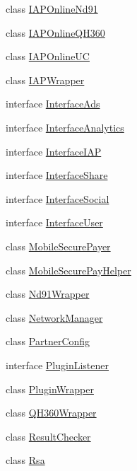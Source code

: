 \begin{DoxyCompactItemize}
class \hyperlink{classorg_1_1cocos2dx_1_1plugin_1_1IAPOnlineNd91}{I\+A\+P\+Online\+Nd91}
\item 
class \hyperlink{classorg_1_1cocos2dx_1_1plugin_1_1IAPOnlineQH360}{I\+A\+P\+Online\+Q\+H360}
\item 
class \hyperlink{classorg_1_1cocos2dx_1_1plugin_1_1IAPOnlineUC}{I\+A\+P\+Online\+UC}
\item 
class \hyperlink{classorg_1_1cocos2dx_1_1plugin_1_1IAPWrapper}{I\+A\+P\+Wrapper}
\item 
interface \hyperlink{interfaceorg_1_1cocos2dx_1_1plugin_1_1InterfaceAds}{Interface\+Ads}
\item 
interface \hyperlink{interfaceorg_1_1cocos2dx_1_1plugin_1_1InterfaceAnalytics}{Interface\+Analytics}
\item 
interface \hyperlink{interfaceorg_1_1cocos2dx_1_1plugin_1_1InterfaceIAP}{Interface\+I\+AP}
\item 
interface \hyperlink{interfaceorg_1_1cocos2dx_1_1plugin_1_1InterfaceShare}{Interface\+Share}
\item 
interface \hyperlink{interfaceorg_1_1cocos2dx_1_1plugin_1_1InterfaceSocial}{Interface\+Social}
\item 
interface \hyperlink{interfaceorg_1_1cocos2dx_1_1plugin_1_1InterfaceUser}{Interface\+User}
\item 
class \hyperlink{classorg_1_1cocos2dx_1_1plugin_1_1MobileSecurePayer}{Mobile\+Secure\+Payer}
\item 
class \hyperlink{classorg_1_1cocos2dx_1_1plugin_1_1MobileSecurePayHelper}{Mobile\+Secure\+Pay\+Helper}
\item 
class \hyperlink{classorg_1_1cocos2dx_1_1plugin_1_1Nd91Wrapper}{Nd91\+Wrapper}
\item 
class \hyperlink{classorg_1_1cocos2dx_1_1plugin_1_1NetworkManager}{Network\+Manager}
\item 
class \hyperlink{classorg_1_1cocos2dx_1_1plugin_1_1PartnerConfig}{Partner\+Config}
\item 
interface \hyperlink{interfaceorg_1_1cocos2dx_1_1plugin_1_1PluginListener}{Plugin\+Listener}
\item 
class \hyperlink{classorg_1_1cocos2dx_1_1plugin_1_1PluginWrapper}{Plugin\+Wrapper}
\item 
class \hyperlink{classorg_1_1cocos2dx_1_1plugin_1_1QH360Wrapper}{Q\+H360\+Wrapper}
\item 
class \hyperlink{classorg_1_1cocos2dx_1_1plugin_1_1ResultChecker}{Result\+Checker}
\item 
class \hyperlink{classorg_1_1cocos2dx_1_1plugin_1_1Rsa}{Rsa}

\end{DoxyCompactItemize}
